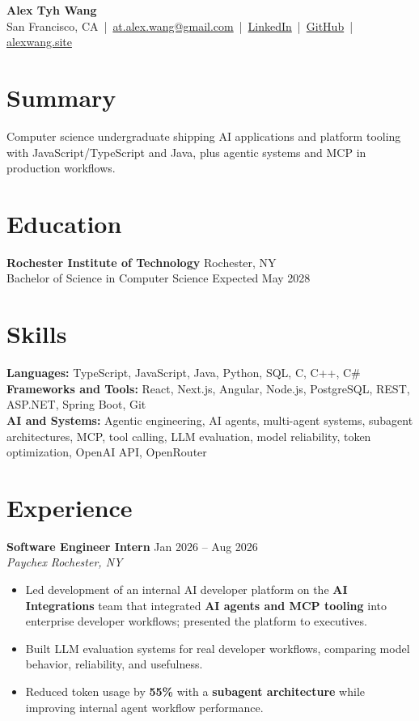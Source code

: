 \documentclass[10pt,letterpaper]{article}
\newif\ifresumeFirstRole
\newcommand{\resumeRole}[4]{%
  \ifresumeFirstRole
    \global\resumeFirstRolefalse
  \else
    \vspace{0pt plus 1fill}%
  \fi
  \textbf{#1} \hfill #2\\
  \textit{#3} \hfill \textit{#4}
}
\begin{document}
\begin{center}
{\Large \textbf{Alex Tyh Wang}}\\
San Francisco, CA \,|\, \href{mailto:at.alex.wang@gmail.com}{at.alex.wang@gmail.com} \,|\, \href{https://www.linkedin.com/in/alex-tyh-wang/}{LinkedIn} \,|\, \href{https://github.com/alextyhwang}{GitHub} \,|\, \href{https://alexwang.site}{alexwang.site}
\end{center}

\section*{Summary}
Computer science undergraduate shipping AI applications and platform tooling with JavaScript/TypeScript and Java, plus agentic systems and MCP in production workflows.

\section*{Education}
\textbf{Rochester Institute of Technology} \hfill Rochester, NY\\
Bachelor of Science in Computer Science \hfill Expected May 2028

\section*{Skills}
\textbf{Languages:} TypeScript, JavaScript, Java, Python, SQL, C, C++, C\#\\
\textbf{Frameworks and Tools:} React, Next.js, Angular, Node.js, PostgreSQL, REST, ASP.NET, Spring Boot, Git\\
\textbf{AI and Systems:} Agentic engineering, AI agents, multi-agent systems, subagent architectures, MCP, tool calling, LLM evaluation, model reliability, token optimization, OpenAI API, OpenRouter

\section*{Experience}
\resumeRole{Software Engineer Intern}{Jan 2026 -- Aug 2026}{Paychex}{Rochester, NY}
\begin{itemize}
  \item Led development of an internal AI developer platform on the \textbf{AI Integrations} team that integrated \textbf{AI agents and MCP tooling} into enterprise developer workflows; presented the platform to executives.
  \item Built LLM evaluation systems for real developer workflows, comparing model behavior, reliability, and usefulness.
  \item Reduced token usage by \textbf{55\%} with a \textbf{subagent architecture} while improving internal agent workflow performance.
\end{itemize}
\end{document}
